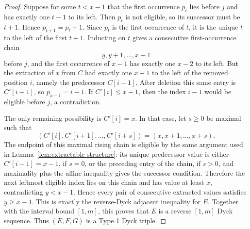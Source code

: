 \documentclass[11pt]{article}
\theoremstyle{plain}
\theoremstyle{definition}
\theoremstyle{remark}
\begin{document}
\begin{proof}
Suppose for some \(t<x-1\) that the first occurrence \(p_t\) lies before \(j\)
and has exactly one \(t-1\) to its left.  Then \(p_t\) is not eligible, so its
successor must be \(t+1\).  Hence \(p_{t+1}=p_t+1\).  Since \(p_t\) is the first
occurrence of \(t\), it is the unique \(t\) to the left of the first \(t+1\).
Inducting on \(t\) gives a consecutive first-occurrence chain
\[
  y,y+1,\ldots,x-1
\]
before \(j\), and the first occurrence of \(x-1\) has exactly one \(x-2\) to
its left.  But the extraction of \(x\) from \(C\) had exactly one \(x-1\) to
the left of the removed position \(i\), namely the predecessor \(C[i-1]\).
After deletion this same entry is \(C'[i-1]\), so \(p_{x-1}=i-1\).
If \(C'[i]\le x-1\), then the index \(i-1\) would be eligible before \(j\), a
contradiction.

The only remaining possibility is \(C'[i]=x\).  In that case, let \(s\ge0\)
be maximal such that
\[
  (C'[i],C'[i+1],\ldots,C'[i+s])=(x,x+1,\ldots,x+s).
\]
The endpoint of this maximal rising chain is eligible by the same argument
used in Lemma~\ref{lem:extractable-structure}: its unique predecessor value is
either \(C'[i-1]=x-1\), if \(s=0\), or the preceding entry of the chain, if
\(s>0\), and maximality plus the affine inequality gives the successor
condition.  Therefore the next leftmost eligible index lies on this chain and
has value at least \(x\), contradicting \(y<x-1\).
Hence every pair of consecutive extracted values satisfies \(y\ge x-1\).  This
is exactly the reverse-Dyck adjacent inequality for \(E\).  Together with the
interval bound \([1,m]\), this proves that \(E\) is a reverse \([1,m]\) Dyck
sequence.  Thus \((E,F,G)\) is a Type 1 Dyck triple.
\end{proof}
\end{document}
